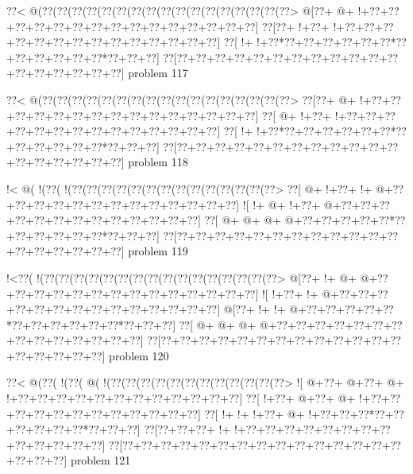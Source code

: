 \vbox{\vbox{\goo
\0??<\- @(\0??(\0??(\0??(\0??(\0??(\0??(\0??(\0??(\0??(\0??(\0??(\0??(\0??(\0??(\0??(\0??(\0??>
\- @[\0??+\- @+\- !+\0??+\0??+\0??+\0??+\0??+\0??+\0??+\0??+\0??+\0??+\0??+\0??+\0??+\0??+\0??]
\0??[\0??+\- !+\0??+\- !+\0??+\0??+\0??+\0??+\0??+\0??+\0??+\0??+\0??+\0??+\0??+\0??+\0??+\0??]
\0??[\- !+\- !+\0??*\0??+\0??+\0??+\0??+\0??+\0??*\0??+\0??+\0??+\0??+\0??+\0??*\0??+\0??+\0??]
\0??[\0??+\0??+\0??+\0??+\0??+\0??+\0??+\0??+\0??+\0??+\0??+\0??+\0??+\0??+\0??+\0??+\0??+\0??]
}
\hfil problem 117\hfil\break
}



\vbox{\vbox{\goo
\0??<\- @(\0??(\0??(\0??(\0??(\0??(\0??(\0??(\0??(\0??(\0??(\0??(\0??(\0??(\0??(\0??(\0??(\0??>
\0??[\0??+\- @+\- !+\0??+\0??+\0??+\0??+\0??+\0??+\0??+\0??+\0??+\0??+\0??+\0??+\0??+\0??+\0??]
\0??[\- @+\- !+\0??+\- !+\0??+\0??+\0??+\0??+\0??+\0??+\0??+\0??+\0??+\0??+\0??+\0??+\0??+\0??]
\0??[\- !+\- !+\0??*\0??+\0??+\0??+\0??+\0??+\0??*\0??+\0??+\0??+\0??+\0??+\0??*\0??+\0??+\0??]
\0??[\0??+\0??+\0??+\0??+\0??+\0??+\0??+\0??+\0??+\0??+\0??+\0??+\0??+\0??+\0??+\0??+\0??+\0??]
}
\hfil problem 118\hfil\break
}



\vbox{\vbox{\goo
\- !<\- @(\- !(\0??(\- !(\0??(\0??(\0??(\0??(\0??(\0??(\0??(\0??(\0??(\0??(\0??(\0??(\0??(\0??>
\0??[\- @+\- !+\0??+\- !+\- @+\0??+\0??+\0??+\0??+\0??+\0??+\0??+\0??+\0??+\0??+\0??+\0??+\0??]
\- ![\- !+\- @+\- !+\0??+\- @+\0??+\0??+\0??+\0??+\0??+\0??+\0??+\0??+\0??+\0??+\0??+\0??+\0??]
\0??[\- @+\- @+\- @+\- @+\0??+\0??+\0??+\0??+\0??*\0??+\0??+\0??+\0??+\0??+\0??*\0??+\0??+\0??]
\0??[\0??+\0??+\0??+\0??+\0??+\0??+\0??+\0??+\0??+\0??+\0??+\0??+\0??+\0??+\0??+\0??+\0??+\0??]
}
\hfil problem 119\hfil\break
}



\vbox{\vbox{\goo
\- !<\0??(\- !(\0??(\0??(\0??(\0??(\0??(\0??(\0??(\0??(\0??(\0??(\0??(\0??(\0??(\0??(\0??(\0??>
\- @[\0??+\- !+\- @+\- @+\0??+\0??+\0??+\0??+\0??+\0??+\0??+\0??+\0??+\0??+\0??+\0??+\0??+\0??]
\- ![\- !+\0??+\- !+\- @+\0??+\0??+\0??+\0??+\0??+\0??+\0??+\0??+\0??+\0??+\0??+\0??+\0??+\0??]
\- @[\0??+\- !+\- !+\- @+\0??+\0??+\0??+\0??+\0??*\0??+\0??+\0??+\0??+\0??+\0??*\0??+\0??+\0??]
\0??[\- @+\- @+\- @+\- @+\0??+\0??+\0??+\0??+\0??+\0??+\0??+\0??+\0??+\0??+\0??+\0??+\0??+\0??]
\0??[\0??+\0??+\0??+\0??+\0??+\0??+\0??+\0??+\0??+\0??+\0??+\0??+\0??+\0??+\0??+\0??+\0??+\0??]
}
\hfil problem 120\hfil\break
}



\vbox{\vbox{\goo
\0??<\- @(\0??(\- !(\0??(\- @(\- !(\0??(\0??(\0??(\0??(\0??(\0??(\0??(\0??(\0??(\0??(\0??(\0??>
\- ![\- @+\0??+\- @+\0??+\- @+\- !+\0??+\0??+\0??+\0??+\0??+\0??+\0??+\0??+\0??+\0??+\0??+\0??]
\0??[\- !+\0??+\- @+\0??+\- @+\- !+\0??+\0??+\0??+\0??+\0??+\0??+\0??+\0??+\0??+\0??+\0??+\0??]
\0??[\- !+\- !+\- !+\0??+\- @+\- !+\0??+\0??+\0??*\0??+\0??+\0??+\0??+\0??+\0??*\0??+\0??+\0??]
\0??[\0??+\0??+\0??+\- !+\- !+\0??+\0??+\0??+\0??+\0??+\0??+\0??+\0??+\0??+\0??+\0??+\0??+\0??]
\0??[\0??+\0??+\0??+\0??+\0??+\0??+\0??+\0??+\0??+\0??+\0??+\0??+\0??+\0??+\0??+\0??+\0??+\0??]
}
\hfil problem 121\hfil\break
}



